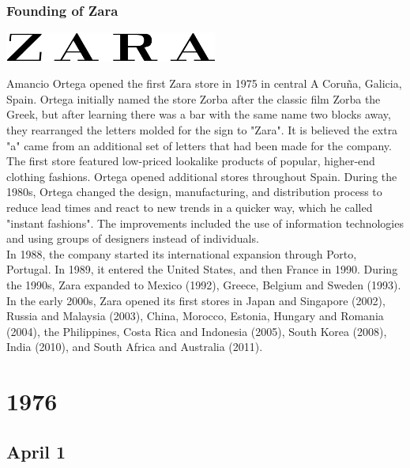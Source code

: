 \documentclass[11pt]{report}
\begin{document}
\subsection{Founding of Zara}
\vspace{2mm}\begin{center}\includegraphics[width=7cm]{./img/zaraLogo.jpg}\end{center}
Amancio Ortega opened the first Zara store in 1975 in central A Coruña, Galicia, Spain. Ortega initially named the store Zorba after the classic film Zorba the Greek, but after learning there was a bar with the same name two blocks away, they rearranged the letters molded for the sign to "Zara". It is believed the extra "a" came from an additional set of letters that had been made for the company. The first store featured low-priced lookalike products of popular, higher-end clothing fashions. Ortega opened additional stores throughout Spain. During the 1980s, Ortega changed the design, manufacturing, and distribution process to reduce lead times and react to new trends in a quicker way, which he called "instant fashions". The improvements included the use of information technologies and using groups of designers instead of individuals.\\ \indent In 1988, the company started its international expansion through Porto, Portugal. In 1989, it entered the United States, and then France in 1990. During the 1990s, Zara expanded to Mexico (1992), Greece, Belgium and Sweden (1993). In the early 2000s, Zara opened its first stores in Japan and Singapore (2002), Russia and Malaysia (2003), China, Morocco, Estonia, Hungary and Romania (2004), the Philippines, Costa Rica and Indonesia (2005), South Korea (2008), India (2010), and South Africa and Australia (2011).

\chapter{1976}
\section{April 1}
\end{document}
